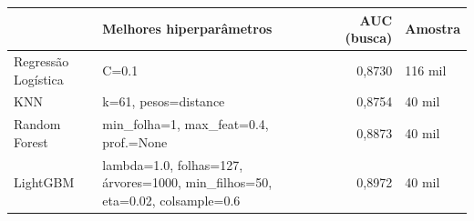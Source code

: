\begin{tabular}{llrl}
\toprule
 & Melhores hiperparâmetros & AUC (busca) & Amostra \\
\midrule
Regressão Logística & C=0.1 & 0,8730 & 116 mil \\
KNN & k=61, pesos=distance & 0,8754 & 40 mil \\
Random Forest & min\_folha=1, max\_feat=0.4, prof.=None & 0,8873 & 40 mil \\
LightGBM & lambda=1.0, folhas=127, árvores=1000, min\_filhos=50, eta=0.02, colsample=0.6 & 0,8972 & 40 mil \\
\bottomrule
\end{tabular}
